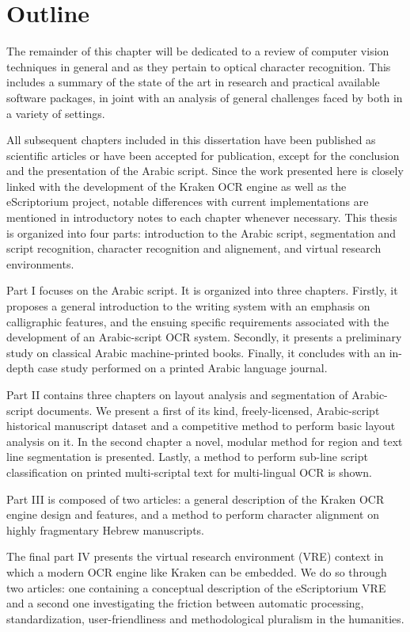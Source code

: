\section{Outline}

The remainder of this chapter will be dedicated to a review of computer vision
techniques in general and as they pertain to optical character recognition.
This includes a summary of the state of the art in research and practical
available software packages, in joint with an analysis of general challenges
faced by both in a variety of settings.

All subsequent chapters included in this dissertation have been published as
scientific articles or have been accepted for publication, except for the
conclusion and the presentation of the Arabic script. Since the work presented
here is closely linked with the development of the Kraken OCR engine as well as
the eScriptorium project, notable differences with current implementations are
mentioned in introductory notes to each chapter whenever necessary.  This
thesis is organized into four parts: introduction to the Arabic script,
segmentation and script recognition, character recognition and alignement, and
virtual research environments.

Part I focuses on the Arabic script. It is organized into three chapters.
Firstly, it proposes a general introduction to the writing system with an
emphasis on calligraphic features, and the ensuing specific requirements
associated with the development of an Arabic-script OCR system. Secondly, it
presents a preliminary study on classical Arabic machine-printed books.
Finally, it concludes with an in-depth case study performed on a printed Arabic
language journal.

Part II contains three chapters on layout analysis and segmentation of
Arabic-script documents. We present a first of its kind, freely-licensed,
Arabic-script historical manuscript dataset and a competitive method to perform
basic layout analysis on it. In the second chapter a novel, modular method for
region and text line segmentation is presented. Lastly, a method to perform
sub-line script classification on printed multi-scriptal text for multi-lingual
OCR is shown.

Part III is composed of two articles: a general description of the Kraken OCR
engine design and features, and a method to perform character alignment on
highly fragmentary Hebrew manuscripts.

The final part IV presents the virtual research environment (VRE) context in
which a modern OCR engine like Kraken can be embedded. We do so through two
articles: one containing a conceptual description of the eScriptorium VRE and a
second one investigating the friction between automatic processing,
standardization, user-friendliness and methodological pluralism in the
humanities.


